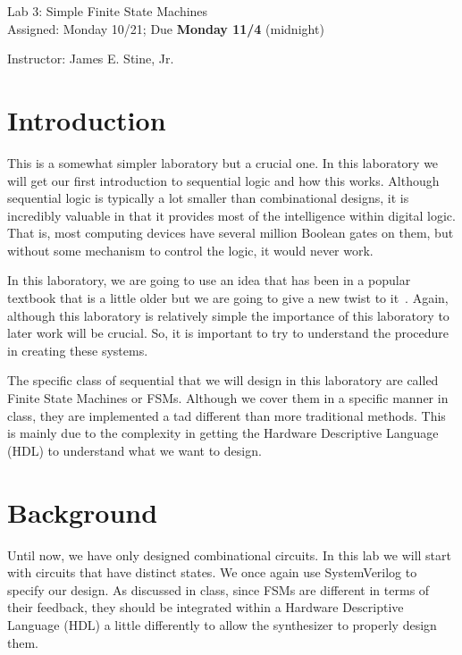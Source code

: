 \documentclass{article}
\newcommand{\myassignment}{Lab 3: Simple Finite State Machines}
\newcommand{\myduedate}{Assigned: Monday 10/21; Due \textbf{Monday 11/4} (midnight)}
\newcommand{\myinstructor}{Instructor: James E. Stine, Jr.}
\begin{document}
\begin{center}
  {\huge \myassignment} \\
  {\large \myduedate} \\
  \begin{flushright}
  \myinstructor \\
  \end{flushright}
\end{center}

\section{Introduction}

This is a somewhat simpler laboratory but a crucial one.  In this
laboratory we will get our first introduction to sequential logic and
how this works.  Although sequential logic is typically a lot smaller
than combinational designs, it is incredibly valuable in that it
provides most of the intelligence within digital logic.  That is, most
computing devices have several million Boolean gates on them, but
without some mechanism to control the logic, it would never work.

In this laboratory, we are going to use an idea that has been in a
popular textbook that is a little older but we are going to give a new
twist to it~\cite{DBLP:books/daglib/0067158}.  Again, although this
laboratory is relatively simple the importance of this laboratory to
later work will be crucial.  So, it is important to try to
understand the procedure in creating these systems.

The specific class of sequential that we will design in this
laboratory are called Finite State Machines or FSMs.  Although we cover them
in a specific manner in class, they are implemented a tad different
than more traditional methods.  This is mainly due to the complexity
in getting the Hardware Descriptive Language (HDL) to understand what
we want to design.

\section{Background}

Until now, we have only designed combinational circuits. In this lab
we will start with circuits that have distinct states. We once again use
SystemVerilog to specify our design.  As discussed in class, since
FSMs are different in terms of their feedback, they should be
integrated within a Hardware Descriptive Language (HDL) a little
differently to allow the synthesizer to properly design them.
\end{document}

